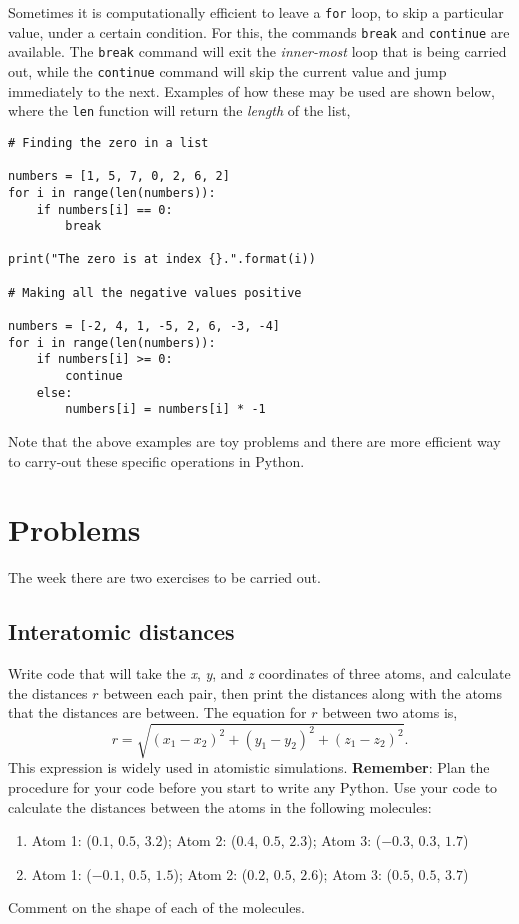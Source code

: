 \documentclass[a4paper]{article}
\begin{document}
Sometimes it is computationally efficient to leave a \texttt{for} loop, to skip a particular value, under a certain condition. 
For this, the commands \texttt{break} and \texttt{continue} are available. 
The \texttt{break} command will exit the \emph{inner-most} loop that is being carried out, while the \texttt{continue} command will skip the current value and jump immediately to the next. 
Examples of how these may be used are shown below, where the \texttt{len} function will return the \emph{length} of the list, 
\begin{lstlisting}
# Finding the zero in a list

numbers = [1, 5, 7, 0, 2, 6, 2]
for i in range(len(numbers)):
	if numbers[i] == 0:
		break

print("The zero is at index {}.".format(i))

# Making all the negative values positive

numbers = [-2, 4, 1, -5, 2, 6, -3, -4]
for i in range(len(numbers)):
	if numbers[i] >= 0:
		continue
	else:
		numbers[i] = numbers[i] * -1
\end{lstlisting}
Note that the above examples are toy problems and there are more efficient way to carry-out these specific operations in Python.

\section{Problems}

The week there are two exercises to be carried out.

\subsection{Interatomic distances}

Write code that will take the \emph{x}, \emph{y}, and \emph{z} coordinates of three atoms, and calculate the distances $r$ between each pair, then print the distances along with the atoms that the distances are between. 
The equation for $r$ between two atoms is, 
\begin{equation}
	r = \sqrt{(x_1 - x_2)^2 + (y_1 - y_2)^2 + (z_1 - z_2)^2}. 
\end{equation}
This expression is widely used in atomistic simulations.
\textbf{Remember}: Plan the procedure for your code before you start to write any Python. 
Use your code to calculate the distances between the atoms in the following molecules:
\begin{enumerate}
	\item{Atom 1: ($0.1$, $0.5$, $3.2$); Atom 2: ($0.4$, $0.5$, $2.3$); Atom 3: ($-0.3$, $0.3$, $1.7$)}
	\item{Atom 1: ($-0.1$, $0.5$, $1.5$); Atom 2: ($0.2$, $0.5$, $2.6$); Atom 3: ($0.5$, $0.5$, $3.7$)}
\end{enumerate}
Comment on the shape of each of the molecules. 
\end{document}
